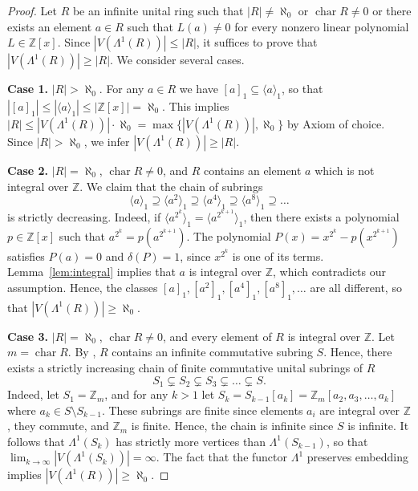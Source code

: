 \documentclass[12pt,a4paper]{amsart}
\theoremstyle{definition}
\newcommand{\Z}{\mathbb{Z}}
\DeclareMathOperator{\ch}{char}
\newcommand{\rng}[1]{\langle #1 \rangle}
\begin{document}
\begin{proof}
    Let $R$ be an infinite unital ring such that $|R| \neq \aleph_0$ or $\ch R \ne 0$ or there exists an element $a \in R$ such that $L(a) \neq 0$ for every nonzero linear polynomial $L \in \Z[x]$.
    Since $|V(\Lambda^1(R))| \leq |R|$, it suffices to prove that $|V(\Lambda^1(R))| \geq |R|$. 
    We consider several cases.

    \medskip
    {\bf Case 1.} $|R|>\aleph_0$.
    For any $a \in R$ we have $[a]_1 \subseteq \rng{a}_1$,
    so that $|[a]_1| \leq |\rng{a}_1| \leq |\Z[x]|=\aleph_0$.
    This implies $|R| \leq |V(\Lambda^1(R))| \cdot \aleph_0 = \max\{|V(\Lambda^1(R))|, \aleph_0\}$ by Axiom of choice. Since $|R|>\aleph_0$, we infer $|V(\Lambda^1(R))| \geq |R|$. 
    
    \medskip
    {\bf Case 2.} $|R|=\aleph_0$, $\ch R \ne 0$, and $R$ contains an element $a$ which is not integral over $\Z$.
    We claim that the chain of subrings
    $$\rng{a}_1 \supseteq \rng{a^2}_1 \supseteq \rng{a^4}_1 \supseteq \rng{a^8}_1 \supseteq \ldots$$
    is strictly decreasing.
    Indeed, if $\rng{a^{2^k}}_1=\rng{a^{2^{k+1}}}_1$, then there exists a polynomial $p \in \Z[x]$ such that $a^{2^k}=p(a^{2^{k+1}})$.
    The polynomial $P(x)=x^{2^k}-p(x^{2^{k+1}})$ satisfies $P(a)=0$ and $\delta(P)=1$, since $x^{2^k}$ is one of its terms.
    Lemma~\ref{lem:integral} implies that $a$ is integral over $\Z$, which contradicts our assumption.
    Hence, the classes $[a]_1,[a^2]_1,[a^4]_1,[a^8]_1,\ldots$ are all different, so that $|V(\Lambda^1(R))| \geq \aleph_0$.
    
    \medskip
    {\bf Case 3.} $|R|=\aleph_0$, $\ch R \ne 0$, and every element of $R$ is integral over $\Z$.
    Let $m= \ch R$.
    By \cite{La72}, $R$ contains an infinite commutative subring $S$.
    Hence, there exists a strictly increasing chain of finite commutative unital subrings of $R$
    $$S_1 \varsubsetneq S_2 \varsubsetneq S_3 \varsubsetneq \ldots \varsubsetneq S.$$
    Indeed, let $S_1=\Z_m$, and for any $k>1$ let $S_k=S_{k-1}[a_k] = \Z_m[a_2,a_3,\ldots,a_k]$ where $a_k \in S \setminus S_{k-1}$.
    These subrings are finite since elements $a_i$ are integral over $\Z$, they commute, and $\Z_m$ is finite. Hence, the chain is infinite since $S$ is infinite.
    It follows that $\Lambda^1(S_k)$ has strictly more vertices than $\Lambda^1(S_{k-1})$, so that $\lim_{k \to \infty} |V(\Lambda^1(S_k))|=\infty$.
    The fact that the functor $\Lambda^1$ preserves embedding implies $|V(\Lambda^1(R))| \geq \aleph_0$.


\end{proof}
\end{document}

